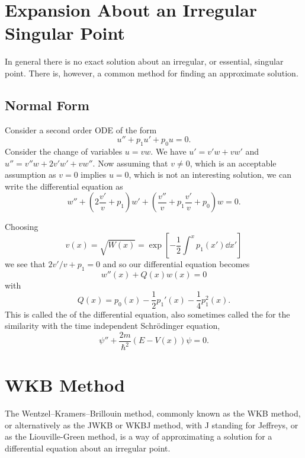 \documentclass[fleqn]{NotesClass}
\begin{document}
    \section{Expansion About an Irregular Singular Point}
    In general there is no exact solution about an irregular, or essential, singular point.
    There is, however, a common method for finding an approximate solution.
    
    \subsection{Normal Form}
    Consider a second order ODE of the form
    \begin{equation}
        u'' + p_1u' + p_0u = 0.
    \end{equation}
    Consider the change of variables \(u = vw\).
    We have \(u' = v'w + vw'\) and \(u'' = v''w + 2v'w' + vw''\).
    Now assuming that \(v \ne 0\), which is an acceptable assumption as \(v = 0\) implies \(u = 0\), which is not an interesting solution, we can write the differential equation as
    \begin{equation}
        w'' + \left( 2\frac{v'}{v} + p_1 \right)w' + \left( \frac{v''}{v} + p_1\frac{v'}{v} + p_0 \right)w = 0.
    \end{equation}
    
    Choosing
    \begin{equation}
        v(x) = \sqrt{W(x)} = \exp\left[ -\frac{1}{2}\int^x p_1(x')\dd{x'} \right]
    \end{equation}
    we see that \(2v'/v + p_1 = 0\) and so our differential equation becomes
    \begin{equation}
        w''(x) + Q(x)w(x) = 0
    \end{equation}
    with
    \begin{equation}
        Q(x) = p_0(x) - \frac{1}{2}p_1'(x) - \frac{1}{4}p_1^2(x).
    \end{equation}
    This is called the  of the differential equation, also sometimes called the  for the similarity with the time independent Schr\"odinger equation,
    \begin{equation}
        \psi'' + \frac{2m}{\hbar^2}(E - V(x))\psi = 0.
    \end{equation}
    
    \section{WKB Method}
    The Wentzel--Kramers--Brillouin method, commonly known as the WKB method, or alternatively as the JWKB or WKBJ method, with J standing for Jeffreys, or as the Liouville-Green method, is a way of approximating a solution for a differential equation about an irregular point.
    
\end{document}

